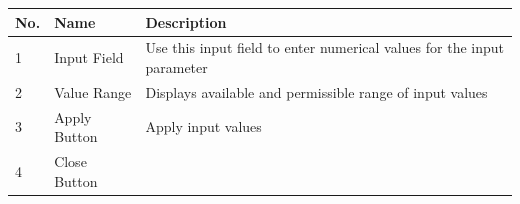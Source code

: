\begin{longtable}[]{@{}lll@{}}
\toprule
\begin{minipage}[b]{0.04\columnwidth}\raggedright
No.\strut
\end{minipage} & \begin{minipage}[b]{0.23\columnwidth}\raggedright
Name\strut
\end{minipage} & \begin{minipage}[b]{0.65\columnwidth}\raggedright
Description\strut
\end{minipage}\tabularnewline
\midrule
\endhead
\begin{minipage}[t]{0.04\columnwidth}\raggedright
1\strut
\end{minipage} & \begin{minipage}[t]{0.23\columnwidth}\raggedright
Input Field\strut
\end{minipage} & \begin{minipage}[t]{0.65\columnwidth}\raggedright
Use this input field to enter numerical values for the input
parameter\strut
\end{minipage}\tabularnewline
\begin{minipage}[t]{0.04\columnwidth}\raggedright
2\strut
\end{minipage} & \begin{minipage}[t]{0.23\columnwidth}\raggedright
Value Range\strut
\end{minipage} & \begin{minipage}[t]{0.65\columnwidth}\raggedright
Displays available and permissible range of input values\strut
\end{minipage}\tabularnewline
\begin{minipage}[t]{0.04\columnwidth}\raggedright
3\strut
\end{minipage} & \begin{minipage}[t]{0.23\columnwidth}\raggedright
Apply Button\strut
\end{minipage} & \begin{minipage}[t]{0.65\columnwidth}\raggedright
Apply input values\strut
\end{minipage}\tabularnewline
\begin{minipage}[t]{0.04\columnwidth}\raggedright
4\strut
\end{minipage} & \begin{minipage}[t]{0.23\columnwidth}\raggedright
Close Button\strut
\end{minipage} & \begin{minipage}[t]{0.65\columnwidth}\raggedright

\end{minipage}
\end{longtable}
